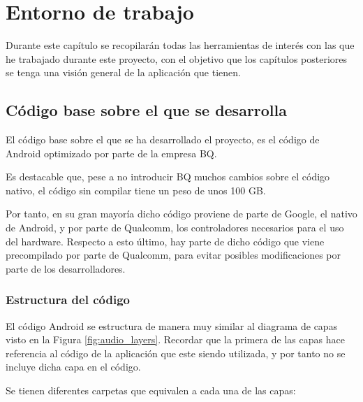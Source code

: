 \chapter{Entorno de trabajo}
Durante este capítulo se recopilarán todas las herramientas de interés con las que he trabajado durante este proyecto, con el objetivo que los capítulos posteriores se tenga una visión general de la aplicación que tienen.

\section{Código base sobre el que se desarrolla}
El código base sobre el que se ha desarrollado el proyecto, es el código de Android optimizado por parte de la empresa BQ.

Es destacable que, pese a no introducir BQ muchos cambios sobre el código nativo, el código sin compilar tiene un peso de unos 100 \gls{GB}.

Por tanto, en su gran mayoría dicho código proviene de parte de Google, el nativo de Android, y por parte de Qualcomm, los controladores necesarios para el uso del hardware. Respecto a esto último, hay parte de dicho código que viene precompilado por parte de Qualcomm, para evitar posibles modificaciones por parte de los desarrolladores.


\subsection{Estructura del código}
El código Android se estructura de manera muy similar al diagrama de capas visto en la Figura \ref{fig:audio_layers}. Recordar que la primera de las capas hace referencia al código de la aplicación que este siendo utilizada, y por tanto no se incluye dicha capa en el código.

Se tienen diferentes carpetas que equivalen a cada una de las capas:

